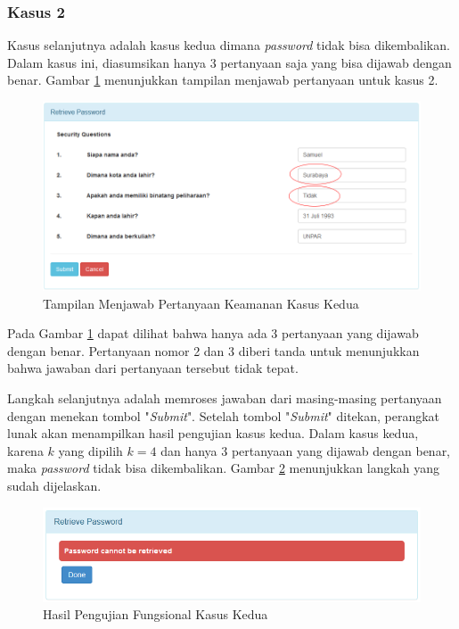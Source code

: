 \subsubsection{Kasus 2}

Kasus selanjutnya adalah kasus kedua dimana \textit{password} tidak bisa dikembalikan. Dalam kasus ini, diasumsikan hanya 3 pertanyaan saja yang bisa dijawab dengan benar. Gambar \ref{fig:fungsional4} menunjukkan tampilan menjawab pertanyaan untuk kasus 2.

\begin{figure}[H]
	\includegraphics[scale=0.6]{Gambar/fungsional4}
	\centering
	\caption{Tampilan Menjawab Pertanyaan Keamanan Kasus Kedua}\label{fig:fungsional4}
\end{figure}

Pada Gambar \ref{fig:fungsional4} dapat dilihat bahwa hanya ada 3 pertanyaan yang dijawab dengan benar. Pertanyaan nomor 2 dan 3 diberi tanda untuk menunjukkan bahwa jawaban dari pertanyaan tersebut tidak tepat.

Langkah selanjutnya adalah memroses jawaban dari masing-masing pertanyaan dengan menekan tombol "\textit{Submit}". Setelah tombol "\textit{Submit}" ditekan, perangkat lunak akan menampilkan hasil pengujian kasus kedua. Dalam kasus kedua, karena $k$ yang dipilih $k=4$ dan hanya 3 pertanyaan yang dijawab dengan benar, maka \textit{password} tidak bisa dikembalikan. Gambar \ref{fig:fungsional5} menunjukkan langkah yang sudah dijelaskan.

\begin{figure}[H]
	\includegraphics[scale=0.7]{Gambar/fungsional5}
	\centering
	\caption{Hasil Pengujian Fungsional Kasus Kedua}\label{fig:fungsional5}
\end{figure}

